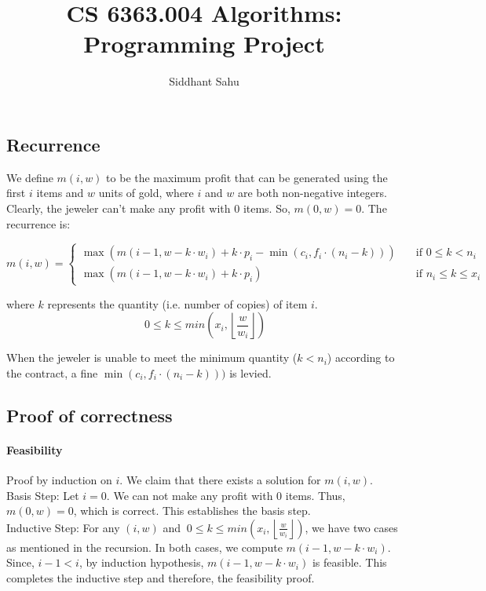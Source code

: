 \documentclass{article}
\title{CS 6363.004 Algorithms: Programming Project}
\author{Siddhant Sahu}
\begin{document}
\maketitle

\subsection*{Recurrence}
We define $m(i, w)$ to be the maximum profit that can be generated using the first $i$ items and $w$ units of gold, where $i$ and $w$ are both non-negative integers. Clearly, the jeweler can't make any profit with 0 items. So, $m(0, w) = 0$. The recurrence is:

\[ m(i, w) =
\begin{cases}
\max (m(i-1, w-k \cdot w_i) + k \cdot p_i - \min (c_i, f_i \cdot (n_i - k)))       & \quad \text{if } 0 \leq k < n_i\\
\max (m(i-1, w-k \cdot w_i) + k \cdot p_i)  & \quad \text{if } n_i \leq k \leq x_i
\end{cases}
\]

where $k$ represents the quantity (i.e. number of copies) of item $i$.
$$\ 0 \leq k \leq min\left(x_i, \left\lfloor\frac{w}{w_i}\right\rfloor\right)$$

When the jeweler is unable to meet the minimum quantity ($k < n_i$) according to the contract, a fine $\min (c_i, f_i \cdot (n_i - k)))$ is levied.

\subsection*{Proof of correctness}

\paragraph{Feasibility}
Proof by induction on $i$. We claim that there exists a solution for $m(i, w)$.\\
Basis Step: Let $i = 0$. We can not make any profit with 0 items. Thus, $m(0, w) = 0$, which is correct. This establishes the basis step.\\
Inductive Step: For any $(i, w)$ and $\ 0 \leq k \leq min\left(x_i, \left\lfloor\frac{w}{w_i}\right\rfloor\right)$, we have two cases as mentioned in the recursion. In both cases, we compute $m(i-1, w-k \cdot w_i)$. Since, $i-1 < i$, by induction hypothesis, $m(i-1, w-k \cdot w_i)$ is feasible. This completes the inductive step and therefore, the feasibility proof.
\end{document}
